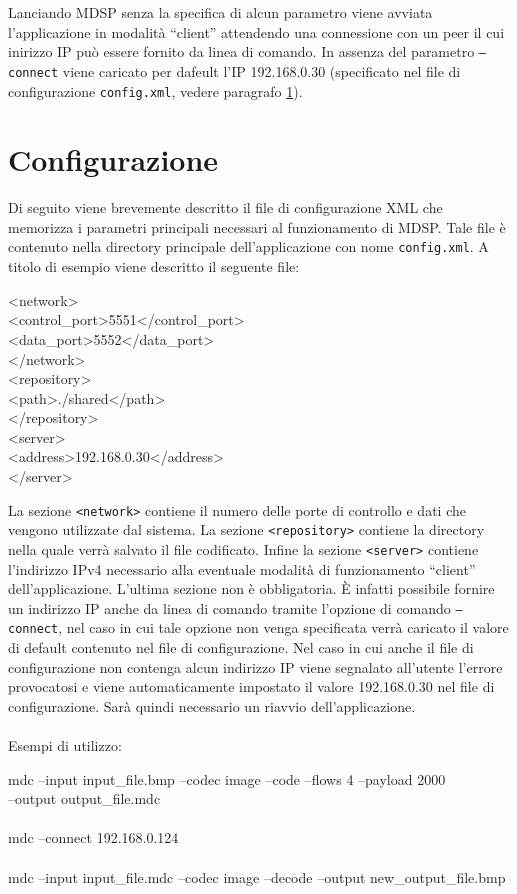 \begin{notabene}
Lanciando MDSP senza la specifica di alcun parametro viene
avviata l'applicazione in modalità ``client'' attendendo una connessione con un peer
il cui inirizzo IP può essere fornito da linea di comando. In assenza del
parametro \texttt{--connect} viene caricato per dafeult l'IP 192.168.0.30
(specificato nel file di configurazione \texttt{config.xml}, vedere paragrafo \ref{cap:xml}).
\end{notabene}

\section{Configurazione}
\label{cap:xml}
Di seguito viene brevemente descritto il file di configurazione XML che
memorizza i parametri principali necessari al funzionamento di MDSP. Tale file
è contenuto nella directory principale dell'applicazione con nome
\texttt{config.xml}. A titolo di esempio viene descritto il seguente file:

\begin{code}
<network>\\
    <control\_port>5551</control\_port>\\
    <data\_port>5552</data\_port>\\
</network>\\
<repository>\\
    <path>./shared</path>\\
</repository>\\
<server>\\
    <address>192.168.0.30</address>\\
</server>\\
\end{code}

La sezione \texttt{<network>} contiene il numero delle porte di controllo e
dati che vengono utilizzate dal sistema. La sezione \texttt{<repository>}
contiene la directory nella quale verrà salvato il file codificato. Infine la
sezione \texttt{<server>} contiene l'indirizzo IPv4 necessario alla eventuale
modalità di funzionamento ``client'' dell'applicazione. L'ultima sezione
non è obbligatoria. \`E infatti possibile fornire un indirizzo IP anche da
linea di comando tramite l'opzione di comando \texttt{--connect}, nel caso in
cui tale opzione non venga specificata verrà caricato il valore di default
contenuto nel file di configurazione. Nel caso in cui anche il file di
configurazione non contenga alcun indirizzo IP viene segnalato all'utente
l'errore provocatosi e viene automaticamente impostato il valore 192.168.0.30
nel file di configurazione. Sarà quindi necessario un riavvio dell'applicazione.
\\\\
Esempi di utilizzo:

\begin{code}
mdc --input input\_file.bmp --codec image --code --flows 4 --payload
2000\\ --output output\_file.mdc\\\\
mdc --connect 192.168.0.124\\\\
mdc --input input\_file.mdc --codec image --decode --output
new\_output\_file.bmp
\end{code}